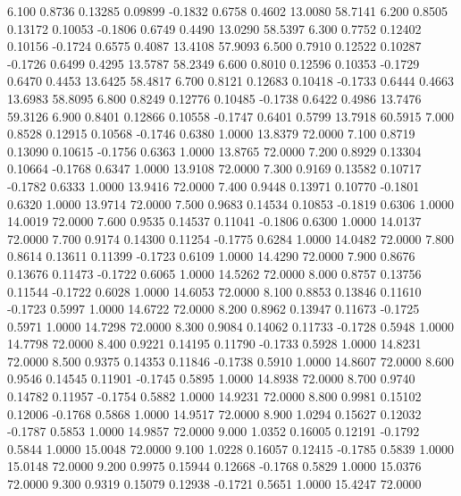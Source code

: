    6.100   0.8736   0.13285   0.09899  -0.1832   0.6758   0.4602  13.0080  58.7141
   6.200   0.8505   0.13172   0.10053  -0.1806   0.6749   0.4490  13.0290  58.5397
   6.300   0.7752   0.12402   0.10156  -0.1724   0.6575   0.4087  13.4108  57.9093
   6.500   0.7910   0.12522   0.10287  -0.1726   0.6499   0.4295  13.5787  58.2349
   6.600   0.8010   0.12596   0.10353  -0.1729   0.6470   0.4453  13.6425  58.4817
   6.700   0.8121   0.12683   0.10418  -0.1733   0.6444   0.4663  13.6983  58.8095
   6.800   0.8249   0.12776   0.10485  -0.1738   0.6422   0.4986  13.7476  59.3126
   6.900   0.8401   0.12866   0.10558  -0.1747   0.6401   0.5799  13.7918  60.5915
   7.000   0.8528   0.12915   0.10568  -0.1746   0.6380   1.0000  13.8379  72.0000
   7.100   0.8719   0.13090   0.10615  -0.1756   0.6363   1.0000  13.8765  72.0000
   7.200   0.8929   0.13304   0.10664  -0.1768   0.6347   1.0000  13.9108  72.0000
   7.300   0.9169   0.13582   0.10717  -0.1782   0.6333   1.0000  13.9416  72.0000
   7.400   0.9448   0.13971   0.10770  -0.1801   0.6320   1.0000  13.9714  72.0000
   7.500   0.9683   0.14534   0.10853  -0.1819   0.6306   1.0000  14.0019  72.0000
   7.600   0.9535   0.14537   0.11041  -0.1806   0.6300   1.0000  14.0137  72.0000
   7.700   0.9174   0.14300   0.11254  -0.1775   0.6284   1.0000  14.0482  72.0000
   7.800   0.8614   0.13611   0.11399  -0.1723   0.6109   1.0000  14.4290  72.0000
   7.900   0.8676   0.13676   0.11473  -0.1722   0.6065   1.0000  14.5262  72.0000
   8.000   0.8757   0.13756   0.11544  -0.1722   0.6028   1.0000  14.6053  72.0000
   8.100   0.8853   0.13846   0.11610  -0.1723   0.5997   1.0000  14.6722  72.0000
   8.200   0.8962   0.13947   0.11673  -0.1725   0.5971   1.0000  14.7298  72.0000
   8.300   0.9084   0.14062   0.11733  -0.1728   0.5948   1.0000  14.7798  72.0000
   8.400   0.9221   0.14195   0.11790  -0.1733   0.5928   1.0000  14.8231  72.0000
   8.500   0.9375   0.14353   0.11846  -0.1738   0.5910   1.0000  14.8607  72.0000
   8.600   0.9546   0.14545   0.11901  -0.1745   0.5895   1.0000  14.8938  72.0000
   8.700   0.9740   0.14782   0.11957  -0.1754   0.5882   1.0000  14.9231  72.0000
   8.800   0.9981   0.15102   0.12006  -0.1768   0.5868   1.0000  14.9517  72.0000
   8.900   1.0294   0.15627   0.12032  -0.1787   0.5853   1.0000  14.9857  72.0000
   9.000   1.0352   0.16005   0.12191  -0.1792   0.5844   1.0000  15.0048  72.0000
   9.100   1.0228   0.16057   0.12415  -0.1785   0.5839   1.0000  15.0148  72.0000
   9.200   0.9975   0.15944   0.12668  -0.1768   0.5829   1.0000  15.0376  72.0000
   9.300   0.9319   0.15079   0.12938  -0.1721   0.5651   1.0000  15.4247  72.0000
